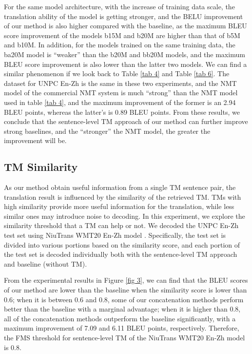 \documentclass[letterpaper]{article} %
\begin{document}
For the same model architecture, with the increase of training data scale, the translation ability of the model is getting stronger, and the BELU improvement of our method is also higher compared with the baseline, as the maximum BLEU score improvement of the models b15M and b20M are higher than that of b5M and b10M. In addition, for the models trained on the same training data, the ba20M model is ``weaker'' than the b20M and bb20M models, and the maximum BLEU score improvement is also lower than the latter two models. We can find a similar phenomenon if we look back to Table \ref{tab 4} and Table \ref{tab 6}. The dataset for UNPC En-Zh is the same in these two experiments, and the NMT model of the commercial NMT system is much ``strong'' than the NMT model used in table \ref{tab 4}, and the maximum improvement of the former is an 2.94 BLEU points, whereas the latter's is 0.89 BLEU points. From these results, we conclude that the sentence-level TM approach of our method can further improve strong baselines, and the ``stronger'' the NMT model, the greater the improvement will be.

\subsection{TM Similarity}

As our method obtain useful information from a single TM sentence pair, the translation result is influenced by the similarity of the retrieved TM. TMs with high similarity provide more useful information for the translation, while less similar ones may introduce noise to decoding. In this experiment, we explore the similarity threshold that a TM can help or not. We decoded the UNPC En-Zh test set using NiuTrans WMT20 En-Zh model \cite{Yuhao2020TheNiuTrans}. Specifically, the test set is divided into various portions based on the similarity score, and each portion of the test set is decoded individually both with the sentence-level TM approach and baseline (without TM).

From the experimental results in Figure \ref{fig 3}, we can find that the BLEU scores of our method are lower than the baseline when the similarity score is lower than 0.6; when it is between 0.6 and 0.8, some of our concatenation methods perform better than the baseline with a marginal advantage; when it is higher than 0.8, all of the concatenation methods outperform the baseline significantly, with a maximum improvement of 7.09 and 6.11 BLEU points, respectively. Therefore, the FMS threshold for sentence-level TM of the NiuTrans WMT20 En-Zh model is 0.8.
\end{document}
